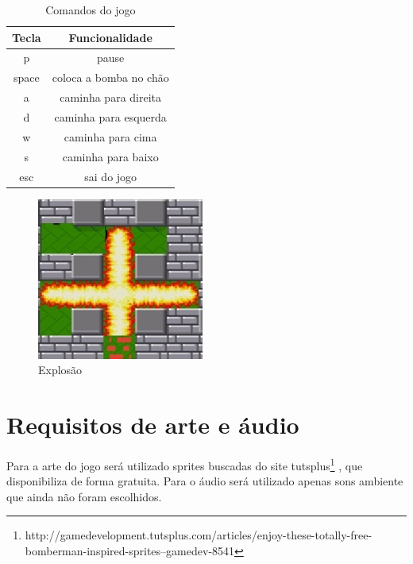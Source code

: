 \documentclass[12pt]{article}
\begin{document}
\begin{table}[h]
\centering
\vspace{0.5cm}
\begin{tabular}{|c|c|}
\hline   
\hline   
Tecla & Funcionalidade \\
\hline   
p & pause  \\
space & coloca a bomba no chão  \\
a & caminha para direita  \\
d & caminha para esquerda  \\
w & caminha para cima  \\
s & caminha para baixo  \\
esc & sai do jogo \\
\hline   
\hline   
\end{tabular}
\caption{Comandos do jogo}
\label{comandos}
\end{table}

\begin{figure}[ht]
\centering
\includegraphics[scale=1]{explosao.jpg}
\caption{Explosão}
\label{bomba}
\end{figure}

\section{Requisitos de arte e áudio}
Para a arte do jogo será utilizado sprites buscadas do site tutsplus\footnote{http://gamedevelopment.tutsplus.com/articles/enjoy-these-totally-free-bomberman-inspired-sprites--gamedev-8541} , que disponibiliza de forma gratuita. Para o áudio será utilizado apenas sons ambiente que ainda não foram escolhidos.
\end{document}
